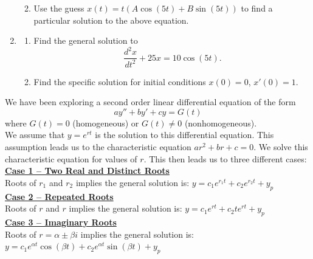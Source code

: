 \begin{enumerate}[resume]
\begin{enumerate}
\clearpage

\item Use the guess $x(t) = t(A\cos(5t) + B\sin(5t))$ to find a particular solution to the above equation. \label{13problem15parte} \vfill

\end{enumerate}

\item \label{13problem16}
\begin{enumerate}
\item Find the general solution to \label{13problem16parta}
\[
\frac{d^2x}{dt^2}+25x=10\cos(5t).
\]
\vspace{1in}
\item Find the specific solution for initial conditions $x(0)=0$, $x'(0)=1$. \label{13problem16partb} \vfill

\end{enumerate}

\end{enumerate}

\clearpage


We have been exploring a second order linear differential equation of the form
\[
ay''+by'+cy=G(t)
\]
where $G(t)=0$ (homogeneous) or $G(t)\neq 0$ (nonhomogeneous). \\

We assume that $y=e^{rt}$ is the solution to this differential equation. This assumption leads us to the characteristic equation $ar^2+br+c=0$. We solve this characteristic equation for values of $r$. This then leads us to three different cases: \\

\textbf{\underline{Case 1 -- Two Real and Distinct Roots}} \\
Roots of $r_1$ and $r_2$ implies the general solution is: $y=c_1e^{r_1t}+c_2e^{r_2t}+y_p$ \\

\textbf{\underline{Case 2 -- Repeated Roots}} \\
Roots of $r$ and $r$ implies the general solution is: $y=c_1e^{rt}+c_2te^{rt}+y_p$ \\

\textbf{\underline{Case 3 -- Imaginary Roots}} \\
Roots of $r=\alpha \pm \beta i$ implies the general solution is: $y=c_1e^{\alpha t}\cos(\beta t)+c_2e^{\alpha t}\sin(\beta t)+y_p$ \\

